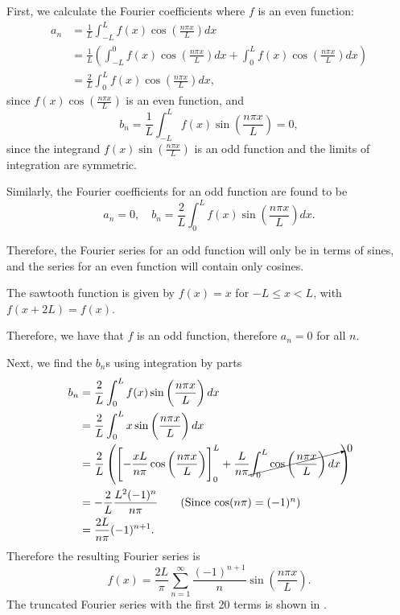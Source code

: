 First, we calculate the Fourier coefficients where $f$ is an even function:
\begin{align*}
	a_n &= \frac{1}{L} \int_{-L}^L f(x)\cos\left(\frac{n\pi x}{L}\right) dx \\
	&= \frac{1}{L} \left(\int_{-L}^0 f(x)\cos\left(\frac{n\pi x}{L}\right) dx + \int_0^L f(x)\cos\left(\frac{n\pi x}{L}\right) dx\right) \\
	&= \frac{2}{L} \int_0^L f(x)\cos\left(\frac{n\pi x}{L}\right) dx,
\end{align*}
since $f(x)\cos\left(\frac{n\pi x}{L}\right)$ is an even function, and
\[
b_n = \frac{1}{L} \int_{-L}^L f(x)\sin\left(\frac{n\pi x}{L}\right) = 0,
\]
since the integrand $f(x)\sin\left(\frac{n\pi x}{L}\right)$ is an odd function and the limits of integration are symmetric.

Similarly, the Fourier coefficients for an odd function are found to be
\[
a_n = 0, \quad b_n = \frac{2}{L} \int_0^L f(x)\sin\left(\frac{n\pi x}{L}\right) dx.
\]

Therefore, the Fourier series for an odd function will only be in terms of sines, and the series for an even function will contain only cosines.

\begin{eg}\label{eg:sawtooth}
	The sawtooth function is given by $f(x)=x$ for $-L\leq x<L$, with $f(x+2L) = f(x)$.
	
	Therefore, we have that $f$ is an odd function, therefore $a_n = 0$ for all $n$.
	
	Next, we find the $b_n$s using integration by parts
	\begin{align*}
		b_n &= \frac{2}{L} \int_0^L f(x)\sin\left(\frac{n\pi x}{L}\right) dx \\
		&= \frac{2}{L} \int_0^L x\sin\left(\frac{n\pi x}{L}\right) dx \\
		&= \frac{2}{L} \left(\left[ -\frac{xL}{n\pi}\cos\left(\frac{n\pi x}{L}\right) \right]_0^L + \frac{L}{n\pi}\cancelto{0}{\int_0^L \cos\left(\frac{n\pi x}{L}\right) dx} \right) \\
		&= -\frac{2}{L} \frac{L^2 (-1)^n}{n\pi} \tag{Since $\cos(n\pi) = (-1)^n$} \\
		&= \frac{2L}{n\pi}(-1)^{n+1}.
	\end{align*}
	Therefore the resulting Fourier series is
	\[
	f(x) = \frac{2L}{\pi} \sum_{n=1}^{\infty} \frac{(-1)^{n+1}}{n} \sin\left(\frac{n\pi x}{L}\right).
	\]
	The truncated Fourier series with the first 20 terms is shown in .
\end{eg}

